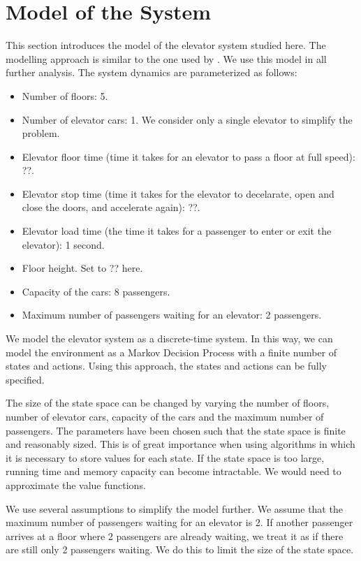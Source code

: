 \section{Model of the System}

This section introduces the model of the elevator system studied here. The modelling approach is similar to the one used by \cite{yuan_2008}. We use this model in all further analysis. The system dynamics are parameterized as follows:

\begin{itemize}
    \item Number of floors: 5.
    \item Number of elevator cars: 1. We consider only a single elevator to simplify the problem.
    \item Elevator floor time (time it takes for an elevator to pass a floor at full speed): ??.
    \item Elevator stop time (time it takes for the elevator to decelarate, open and close the doors, and accelerate again): ??.
    \item Elevator load time (the time it takes for a passenger to enter or exit the elevator): 1 second.
    \item Floor height. Set to ?? here.
    \item Capacity of the cars: 8 passengers.
    \item Maximum number of passengers waiting for an elevator: 2 passengers.
\end{itemize}

We model the elevator system as a discrete-time system. In this way, we can model the environment as a Markov Decision Process with a finite number of states and actions. Using this approach, the states and actions can be fully specified.

The size of the state space can be changed by varying the number of floors, number of elevator cars, capacity of the cars and the maximum number of passengers. The parameters have been chosen such that the state space is finite and reasonably sized. This is of great importance when using algorithms in which it is necessary to store values for each state. If the state space is too large, running time and memory capacity can become intractable. We would need to approximate the value functions. 

We use several assumptions to simplify the model further. We assume that the maximum number of passengers waiting for an elevator is 2. If another passenger arrives at a floor where 2 passengers are already waiting, we treat it as if there are still only 2 passengers waiting. We do this to limit the size of the state space.

